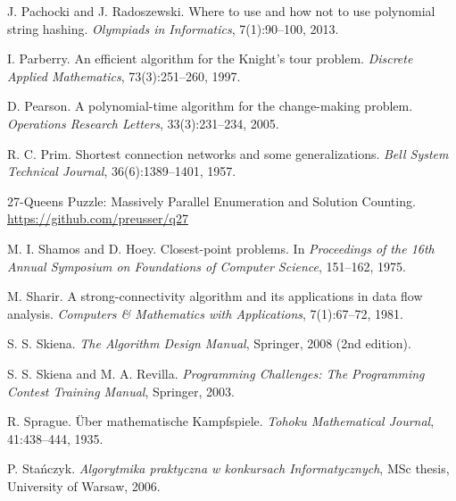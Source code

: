 \begin{thebibliography}{9}

  J. Pachocki and J. Radoszewski.
  Where to use and how not to use polynomial string hashing.
  \emph{Olympiads in Informatics}, 7(1):90--100, 2013.

  I. Parberry.
  An efficient algorithm for the Knight's tour problem.
  \emph{Discrete Applied Mathematics}, 73(3):251--260, 1997.


  D. Pearson.
  A polynomial-time algorithm for the change-making problem.
  \emph{Operations Research Letters}, 33(3):231--234, 2005.

  R. C. Prim.
  Shortest connection networks and some generalizations.
  \emph{Bell System Technical Journal}, 36(6):1389--1401, 1957.


  27-Queens Puzzle: Massively Parallel Enumeration and Solution Counting.
  \url{https://github.com/preusser/q27}

  M. I. Shamos and D. Hoey.
  Closest-point problems.
  In \emph{Proceedings of the 16th Annual Symposium on Foundations of Computer Science}, 151--162, 1975.

  M. Sharir.
  A strong-connectivity algorithm and its applications in data flow analysis.
  \emph{Computers \& Mathematics with Applications}, 7(1):67--72, 1981.

  S. S. Skiena.
  \emph{The Algorithm Design Manual}, Springer, 2008 (2nd edition).

  S. S. Skiena and M. A. Revilla.
  \emph{Programming Challenges: The Programming Contest Training Manual},
  Springer, 2003.

  R. Sprague.
  Über mathematische Kampfspiele.
  \emph{Tohoku Mathematical Journal}, 41:438--444, 1935.

  P. Stańczyk.
  \emph{Algorytmika praktyczna w konkursach Informatycznych},
  MSc thesis, University of Warsaw, 2006.


\end{thebibliography}
